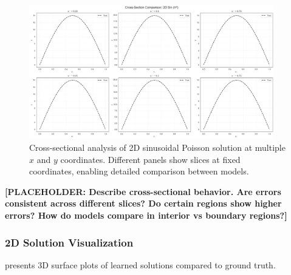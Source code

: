\documentclass[11pt,a4paper]{article}
\begin{document}
\begin{figure}[htbp]
\centering
\includegraphics[width=0.95\textwidth]{../section1/analysis/section1_complete_analysis_20251021_143055/section1_3_analysis/03_heatmap_analysis/cross_section_0_2D Sin (π²).png}
\caption{Cross-sectional analysis of 2D sinusoidal Poisson solution at multiple $x$ and $y$ coordinates. Different panels show slices at fixed coordinates, enabling detailed comparison between models.}
\label{fig:s13_cross_sin}
\end{figure}

\textbf{[PLACEHOLDER: Describe cross-sectional behavior. Are errors consistent across different slices? Do certain regions show higher errors? How do models compare in interior vs boundary regions?]}

\subsubsection{2D Solution Visualization}

 presents 3D surface plots of learned solutions compared to ground truth.
\end{document}
